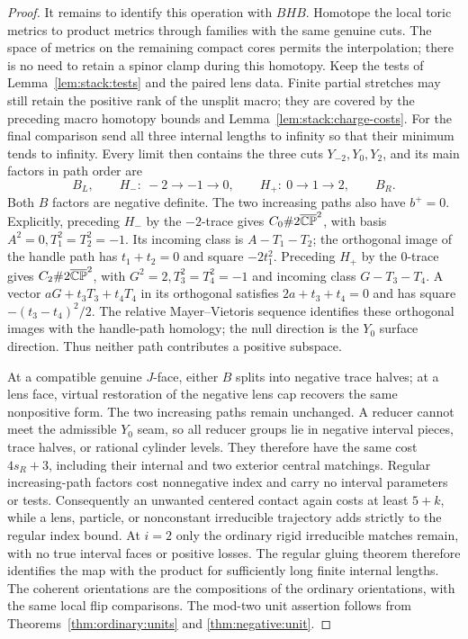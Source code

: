\begin{proof}
It remains to identify this operation with \(BHB\).  Homotope the
local toric metrics to product
metrics through families with the same genuine cuts.  The space of
metrics on the remaining compact cores permits the interpolation;
there is no need to retain a spinor clamp during this homotopy.
Keep the tests of Lemma~\ref{lem:stack:tests} and the paired lens
data.  Finite partial stretches may still retain the positive
rank of the unsplit macro; they are covered by the preceding macro
homotopy bounds and Lemma~\ref{lem:stack:charge-costs}.  For the
final comparison send all three internal lengths to infinity so
that their minimum tends to infinity.  Every limit then contains
the three cuts \(Y_{-2},Y_0,Y_2\), and its main factors in path
order are
\[
 B_L,\qquad H_-:\ -2\to-1\to0,\qquad
 H_+:\ 0\to1\to2,\qquad B_R.
\]
Both \(B\) factors are negative definite.  The two increasing
paths also have \(b^+=0\).  Explicitly, preceding \(H_-\) by
the \(-2\)-trace gives \(C_0\#2\overline{\mathbb{CP}}^{2}\),
with basis \(A^2=0,T_1^2=T_2^2=-1\).  Its incoming class is
\(A-T_1-T_2\); the orthogonal image of the handle path has
\(t_1+t_2=0\) and square \(-2t_1^2\).  Preceding \(H_+\)
by the \(0\)-trace gives \(C_2\#2\overline{\mathbb{CP}}^{2}\),
with \(G^2=2,T_3^2=T_4^2=-1\) and incoming class
\(G-T_3-T_4\).  A vector \(aG+t_3T_3+t_4T_4\) in its
orthogonal satisfies \(2a+t_3+t_4=0\) and has square \(-(t_3-t_4)^2/2\).
The relative Mayer--Vietoris sequence identifies these orthogonal
images with the handle-path homology; the null direction is the
\(Y_0\) surface direction.  Thus neither path contributes a
positive subspace.

At a compatible genuine \(J\)-face, either \(B\) splits into
negative trace halves; at a lens face, virtual restoration of the
negative lens cap recovers the same nonpositive form.  The two
increasing paths remain unchanged.  A reducer cannot meet the
admissible \(Y_0\) seam, so all reducer groups lie in negative
interval pieces, trace halves, or rational cylinder levels.  They
therefore have the same cost \(4s_R+3\), including their internal
and two exterior central matchings.  Regular increasing-path
factors cost nonnegative index and carry no interval parameters or
tests.  Consequently an unwanted centered contact again costs at
least \(5+k\), while a lens, particle, or nonconstant irreducible
trajectory adds strictly to the regular index bound.  At \(i=2\)
only the ordinary rigid irreducible matches remain, with no true
interval faces or positive losses.  The regular gluing theorem therefore identifies the map with the product
for sufficiently long finite internal lengths.  The coherent
orientations are the compositions of the ordinary orientations, with
the same local flip comparisons.  The mod-two unit assertion follows
from Theorems~\ref{thm:ordinary:units} and
\ref{thm:negative:unit}.
\end{proof}

